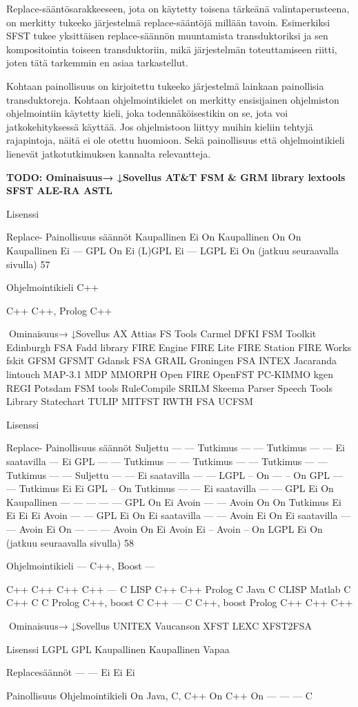 \documentclass[free]{flammie}
\begin{document}
Replace-sääntösarakkeeseen, jota on käytetty toisena tärkeänä valintaperusteena, on merkitty tukeeko järjestelmä replace-sääntöjä millään tavoin. Esimerkiksi SFST tukee yksittäisen replace-säännön muuntamista transduktoriksi ja sen
kompositointia toiseen transduktoriin, mikä järjestelmän toteuttamiseen riitti, joten tätä tarkemmin en asiaa tarkastellut.

Kohtaan painollisuus on kirjoitettu tukeeko järjestelmä lainkaan painollisia
transduktoreja. Kohtaan ohjelmointikielet on merkitty ensisijainen ohjelmiston
ohjelmointiin käytetty kieli, joka todennäköisestikin on se, jota voi jatkokehityksessä käyttää. Jos ohjelmistoon liittyy muihin kieliin tehtyjä rajapintoja, näitä ei
ole otettu huomioon. Sekä painollisuus että ohjelmointikieli lienevät jatkotutkimuksen kannalta relevantteja.

\begin{table}
    \caption{Tarkasteltavat äärellistilaiset koodikannat}
    \bf TODO:
Ominaisuus→
↓Sovellus
AT\&T FSM \&
GRM library
lextools
SFST
ALE-RA
ASTL

Lisenssi

Replace- Painollisuus
säännöt
Kaupallinen Ei
On
Kaupallinen On
On
Kaupallinen Ei
—
GPL
On
Ei
(L)GPL
Ei
—
LGPL
Ei
On
(jatkuu seuraavalla sivulla)
57

Ohjelmointikieli
C++

C++
C++, Prolog
C++

Ominaisuus→
↓Sovellus
AX
Attias FS Tools
Carmel
DFKI FSM Toolkit
Edinburgh FSA
Fadd library
FIRE Engine
FIRE Lite
FIRE Station
FIRE Works
fskit
GFSM
GFSMT
Gdansk FSA
GRAIL
Groningen FSA
INTEX
Jacaranda
lintouch
MAP-3.1
MDP
MMORPH
Open FIRE
OpenFST
PC-KIMMO
kgen
REGI
Potsdam FSM tools
RuleCompile
SRILM
Skeema Parser
Speech Tools Library
Statechart
TULIP
MITFST
RWTH FSA
UCFSM

Lisenssi

Replace- Painollisuus
säännöt
Suljettu
—
—
Tutkimus
—
—
Tutkimus
—
—
Ei saatavilla —
Ei
GPL
—
—
Tutkimus
—
—
Tutkimus
—
—
Tutkimus
—
—
Tutkimus
—
—
Suljettu
—
—
Ei saatavilla —
—
LGPL
–
On
—
–
On
GPL
—
—
Tutkimus
Ei
Ei
GPL
–
On
Tutkimus
—
—
Ei saatavilla —
—
GPL
Ei
On
Kaupallinen —
—
—
—
—
GPL
On
Ei
Avoin
—
—
Avoin
On
On
Tutkimus
Ei
Ei
Ei
Ei
Avoin
—
—
GPL
Ei
On
Ei saatavilla —
—
Avoin
Ei
On
Ei saatavilla —
—
Avoin
Ei
On
—
—
—
Avoin
On
Ei
Avoin
Ei
–
Avoin
–
On
LGPL
Ei
On
(jatkuu seuraavalla sivulla)
58

Ohjelmointikieli
—
C++, Boost
—

C++
C++
C++
C++
—
C
LISP
C++
C++
Prolog
C
Java
C
CLISP
Matlab
C
C++
C
C
Prolog
C++, boost
C
C++
—
C
C++, boost
Prolog
C++
C++
C++

Ominaisuus→
↓Sovellus
UNITEX
Vaucanson
XFST
LEXC
XFST2FSA

Lisenssi
LGPL
GPL
Kaupallinen
Kaupallinen
Vapaa

Replacesäännöt
—
—
Ei
Ei
Ei

Painollisuus Ohjelmointikieli
On
Java, C, C++
On
C++
On
—
—
—
C
\end{table}
\end{document}
